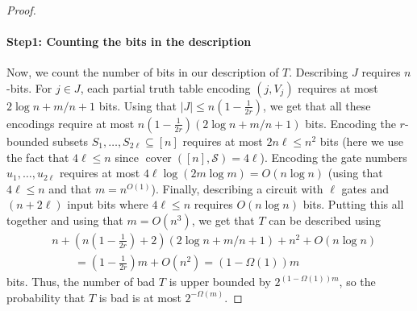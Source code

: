 \documentclass[10pt,a4paper]{article}
\begin{document}
\begin{proof}
\paragraph{Step1: Counting the bits in the description}
Now, we count the number of bits in our description of $T$. Describing $J$ requires $n$-bits. For $j\in J$, each partial truth table encoding $(j,V_j)$ requires at most $2\log n+m/n+1$ bits. Using that $|J|\leq n(1-\frac1{2r})$, we get that all these encodings require at most $n(1-\frac1{2r})(2\log n+m/n+1)$ bits. Encoding the $r$-bounded subsets $S_1,\ldots,S_{2\ell}\subseteq[n]$ requires at most $2n\ell\leq n^2$ bits (here we use the fact that $4\ell\leq n$ since $\operatorname{cover}([n],\mathcal S)=4\ell$). Encoding the gate numbers $u_1,\ldots,u_{2\ell}$ requires at most $4\ell\log(2m\log m)=O(n\log n)$ (using that $4\ell\leq n$ and that $m=n^{O(1)}$). Finally, describing a circuit with $\ell$ gates and $(n+2\ell)$ input bits where $4\ell\leq n$ requires $O(n\log n)$ bits. Putting this all together and using that $m=O(n^3)$, we get that $T$ can be described using
\begin{align*}&n+(n(1-\tfrac1{2r})+2)(2\log n+m/n+1)+n^2+O(n\log n)\\&\qquad=(1-\tfrac1{2r})m+O(n^2)=(1-\Omega(1))m\end{align*}
bits. Thus, the number of bad $T$ is upper bounded by $2^{(1-\Omega(1))m}$, so the probability that $T$ is bad is at most $2^{-\Omega(m)}$.
\end{proof}
\end{document}
